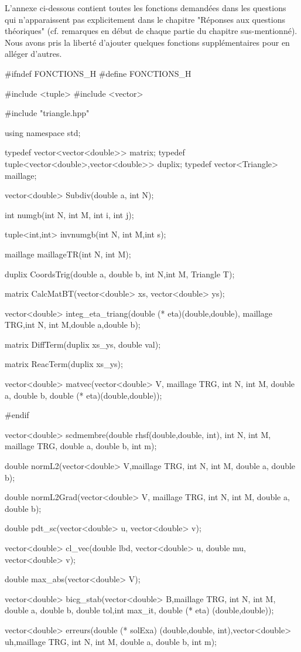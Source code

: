 \label{sec:fonctions}
L'annexe ci-dessous contient toutes les fonctions demandées dans les questions qui n'apparaissent pas explicitement dans le chapitre "Réponses aux questions théoriques" (cf. remarques en début de chaque partie du chapitre sus-mentionné). Nous avons pris la liberté d'ajouter quelques fonctions supplémentaires pour en alléger d'autres.

\vspace{0.8em}

\begin{codeblock}
#ifndef FONCTIONS_H
#define FONCTIONS_H

#include <tuple>
#include <vector>


#include "triangle.hpp"

using namespace std;

typedef vector<vector<double>> matrix;
typedef tuple<vector<double>,vector<double>> duplix;
typedef vector<Triangle> maillage;

vector<double> Subdiv(double a, int N);

int numgb(int N, int M, int i, int j);

tuple<int,int> invnumgb(int N, int M,int s);

maillage maillageTR(int N, int M);

duplix CoordsTrig(double a, double b, int N,int M, Triangle T);

matrix CalcMatBT(vector<double> xs, vector<double> ys);

vector<double> integ_eta_triang(double (* eta)(double,double),
    maillage TRG,int N, int M,double a,double b);

matrix DiffTerm(duplix xs_ys, double val);

matrix ReacTerm(duplix xs_ys);

vector<double> matvec(vector<double> V, maillage TRG, int N, int M,
    double a, double b, double (* eta)(double,double));

#endif

vector<double> scdmembre(double rhsf(double,double, int), int N, int M, maillage TRG, double a, double b, int m);

double normL2(vector<double> V,maillage TRG, int N, int M, double a, double b);

double normL2Grad(vector<double> V, maillage TRG, int N, int M, double a, double b);

double pdt_sc(vector<double> u, vector<double> v);

vector<double> cl_vec(double lbd, vector<double> u, double mu, vector<double> v);

double max_abs(vector<double> V);

vector<double> bicg_stab(vector<double> B,maillage TRG, int N, int M, double a,
    double b, double tol,int max_it, double (* eta) (double,double));

vector<double> erreurs(double (* solExa) (double,double, int),vector<double> uh,maillage TRG, int N, int M, double a, double b, int m);
\end{codeblock}

